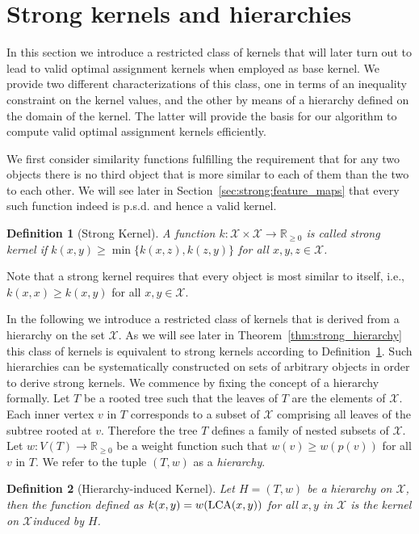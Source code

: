 \documentclass{article}
\newtheorem{definition}{Definition}
\newcommand{\X}{\ensuremath{\mathcal{X}}\xspace}
\newcommand{\bbRnn}[0]{\ensuremath{\mathbb{R}_{\geq0}}\xspace}
\begin{document}
\section{Strong kernels and hierarchies}
In this section we introduce a restricted class of kernels that will later turn 
out to lead to valid optimal assignment kernels when employed as base kernel.
We provide two different characterizations of this class, one in terms of an
inequality constraint on the kernel values, and the other by means of a hierarchy
defined on the domain of the kernel. The latter will provide the basis for our 
algorithm to compute valid optimal assignment kernels efficiently.

We first consider similarity functions fulfilling the requirement that for any 
two objects there is no third object that is more similar to each of them than 
the two to each other.
We will see later in Section~\ref{sec:strong:feature_maps} that every such 
function indeed is p.s.d. and hence a valid kernel.
\begin{definition}[Strong Kernel]\label{def:strong}
 A function 
 $k : \X \times \X \to \bbRnn$ is called \emph{strong kernel} 
 if $k(x,y) \geq \min\{k(x,z), k(z,y)\}$ for all $x,y,z \in \X$.
\end{definition}
Note that a strong kernel requires that every object is most similar to itself, 
i.e.,  $k(x,x) \geq k(x,y)$ for all $x,y \in \X$.


In the following we introduce a restricted class of kernels that is derived
from a hierarchy on the set \X. As we will see later in 
Theorem~\ref{thm:strong_hierarchy} this class of kernels is equivalent to 
strong kernels according to Definition~\ref{def:strong}.
Such hierarchies can be systematically constructed on sets of arbitrary objects 
in order to derive strong kernels.
We commence by fixing the concept of a hierarchy formally.
Let $T$ be a rooted tree such that the leaves of $T$ are the elements of 
\X.
Each inner vertex $v$ in $T$ corresponds to a subset of \X comprising 
all leaves of the subtree rooted at $v$. Therefore the tree $T$ defines a 
family of nested subsets of \X. 
Let $w : V(T) \to \bbRnn$ be a weight function such that $w(v) \geq w(p(v))$ for
all $v$ in $T$. We refer to the tuple $(T,w)$ as a \emph{hierarchy}. 

\begin{definition}[Hierarchy-induced Kernel]\label{def:h_induced}
 Let $H=(T,w)$ be a hierarchy on \X, then the function defined as
 $k(x,y) = w({\rm LCA}(x,y))$ for all $x,y$ in \X is the 
 kernel on \X \emph{induced} by $H$. 
\end{definition}
\end{document}
